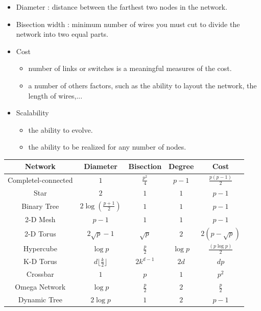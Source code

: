 \documentclass[11pt,a4paper]{report}
\begin{document}
\begin{itemize}
    \item Diameter : distance between the farthest two nodes in the network.
    \item Bisection width : minimum number of wires you must cut to divide the network into two equal parts.
    \item Cost
        \begin{itemize}
            \item number of links or switches is a meaningful measures of the cost.
            \item a number of others factors, such as the ability to layout the network, the length of wires,...
        \end{itemize}
    \item Scalability
        \begin{itemize}
            \item the ability to evolve.
            \item the ability to be realized for any number of nodes.
        \end{itemize}
\end{itemize}

\begin{table}[h]
\centering
\begin{tabular}{|ccccc|}
    \hline
    Network & Diameter & Bisection & Degree & Cost \\\hline
    Completel-connected & $1$ & $\frac{p^2}{4}$ & $p-1$ & $\frac{p(p-1)}{2}$ \\
    Star & $2$ & $1$ & $1$ & $p-1$ \\
    Binary Tree & $2\log(\frac{p+1}{2})$ & $1$ & $1$ & $p-1$ \\
    2-D Mesh & $p-1$ & $1$ & $1$ & $p-1$ \\ 
    2-D Torus & $2\sqrt{p}-1$ & $\sqrt{p}$ & $2$ & $2(p-\sqrt{p})$ \\
    Hypercube & $\log p$ & $\frac{p}{2}$ & $\log p$ & $\frac{(p \log p)}{2}$ \\
    K-D Torus & $d\lfloor\frac{k}{2}\rfloor$ & $2k^{d-1}$ & $2d$ & $dp$ \\
    Crossbar & $1$ & $p$ & $1$ & $p^2$ \\
    Omega Network & $\log p$ & $\frac{p}{2}$ & $2$ & $\frac{p}{2}$ \\
    Dynamic Tree & $2\log p$ & $1$ & $2$ & $p-1$ \\
    \hline
\end{tabular}
\end{table}
\end{document}
